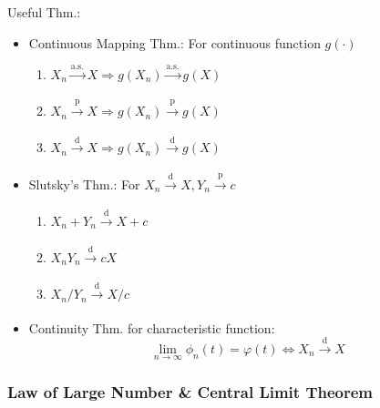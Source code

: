         Useful Thm.:
        \begin{itemize}
            \item Continuous Mapping Thm.: For continuous function $g(\cdot)$
            \begin{enumerate}
                \item $X_n\xrightarrow[]{\text{a.s.}}X\Rightarrow g(X_n)\xrightarrow[]{\text{a.s.}}g(X)$
                \item $X_n\xrightarrow[]{\mathrm{p}}X\Rightarrow g(X_n)\xrightarrow[]{\mathrm{p} }g(X)$
                \item $X_n\xrightarrow[]{\mathrm{d}}X\Rightarrow g(X_n)\xrightarrow[]{\mathrm{d}}g(X)$
            \end{enumerate}
            \item Slutsky's Thm.: For $X_n\xrightarrow[]{\mathrm{d}}X,Y_n\xrightarrow[]{\mathrm{p}}c$
            \begin{enumerate}
                \item $X_n+Y_n\xrightarrow[]{\mathrm{d}}X+c$
                \item $X_nY_n\xrightarrow[]{\mathrm{d}}cX$
                \item $X_n/Y_n\xrightarrow[]{\mathrm{d}}X/c$
            \end{enumerate}
            \item Continuity Thm. for characteristic function:
            \begin{equation}        \lim_{n\to\infty}\phi_n(t)=\varphi(t)\Leftrightarrow X_n\xrightarrow[]{\mathrm{d}}X\end{equation}
        \end{itemize} 


\subsubsection{Law of Large Number \& Central Limit Theorem}

